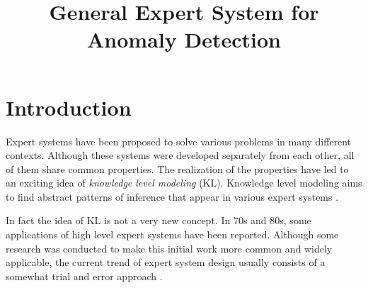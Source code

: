 \documentclass[conference]{IEEEtran}
\begin{document}
\title{General Expert System for Anomaly Detection}

\author{
}

\maketitle


\begin{abstract}

\end{abstract}

\IEEEpeerreviewmaketitle

\section{Introduction}

Expert systems have been proposed to solve various problems in many different contexts.
Although these systems were developed separately from each other, all of them share common properties. 
The realization of the properties have led to an exciting idea of \textit{knowledge level modeling} (KL).
Knowledge level modeling aims to find abstract patterns of inference that appear in various expert systems \cite{Menzies97object-orientedpatterns:}.

In fact the idea of KL is not a very new concept.
In 70s and 80s, some applications of high level expert systems have been reported.
Although some research was conducted to make this initial work more common and widely applicable, the current trend of expert system design usually consists of a somewhat trial and error approach \cite{Menzies1996}.
\end{document}
